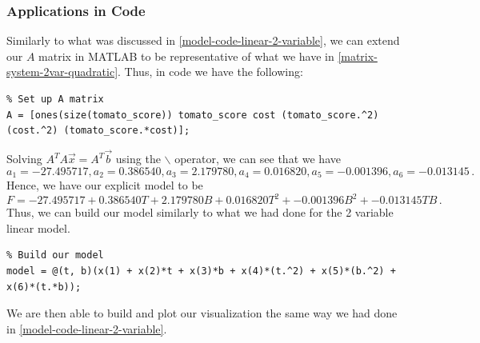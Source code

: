 \documentclass[11pt]{article}
\begin{document}
\subsubsection{Applications in Code}
\label{model-code-quadratic-2-variable}
Similarly to what was discussed in \ref{model-code-linear-2-variable}, we can extend our $A$ matrix in MATLAB to be representative of what we have in \ref{matrix-system-2var-quadratic}.  
Thus, in code we have the following:
\begin{lstlisting}
% Set up A matrix
A = [ones(size(tomato_score)) tomato_score cost (tomato_score.^2) (cost.^2) (tomato_score.*cost)];
\end{lstlisting}
Solving $A^T A \overrightarrow{x} = A^T \overrightarrow{b}$ using the $\backslash$ operator, we can see that we have
\[a_1 = -27.495717, a_2 = 0.386540, a_3 = 2.179780, a_4 = 0.016820, a_5 = -0.001396, a_6 = -0.013145 \, .\]
Hence, we have our explicit model to be 
\[ F = -27.495717 + 0.386540 T + 2.179780 B + 0.016820 T^2 + -0.001396 B^2 + -0.013145 TB \, .\]
Thus, we can build our model similarly to what we had done for the 2 variable linear model.
\begin{lstlisting}
% Build our model
model = @(t, b)(x(1) + x(2)*t + x(3)*b + x(4)*(t.^2) + x(5)*(b.^2) + x(6)*(t.*b));
\end{lstlisting}
We are then able to build and plot our visualization the same way we had done in \ref{model-code-linear-2-variable}.

\newpage
\end{document}
